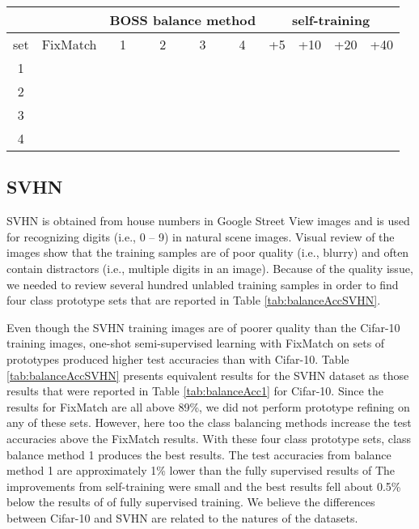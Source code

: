 \documentclass[final]{cvpr}
\newcommand{\OSSSL}{one-shot semi-supervised learning }
\begin{document}
\begin{table*}
	\begin{center}
		\begin{tabular}{|c|c|c|c|c|c|c|c|c|c|}
			\hline
			&  & \multicolumn{4}{|c|}{BOSS balance method} & \multicolumn{4}{|c|}{self-training}    \\
			\hline
			set  & FixMatch & 1 & 2 & 3 & 4 & +5 & +10 & +20 & +40    \\
			\hline\hline
			1 &   &    &   &  &  &  &  &  &    \\
			\hline
			2 &   &    &   &  &  &  &  &  &    \\
			\hline
			3 &   &    &   &  &  &  &  &  &    \\
			\hline
			4 &   &    &   &  &  &  &  &  &    \\
			\hline
			
		\end{tabular}
	\end{center}
	\caption{\textbf{SVHN.} BOSS methods are compared using four sets of class prototypes (i.e., 1 prototype per class) for SVHN.  The FixMatch column shows results for the original FixMatch code on the prototype sets. The next four columns gives the accuracy results for the class balance methods  Results are an average of test accuracies for four runs.  The self-training iteration was performed on the results from the class balancing shown in bold.
	}
	\label{tab:balanceAccSVHN}
\end{table*}

\subsection{SVHN}
\label{sec:svhn}

SVHN is obtained from house numbers in Google Street View images and is used for recognizing digits (i.e., 0 -- 9) in natural scene images. 
Visual review of the images show that the training samples are of poor quality (i.e., blurry) and often contain distractors (i.e.,  multiple digits in an image).
Because of the quality issue, we needed to review several hundred unlabled training samples in order to find four class prototype sets that are reported in Table \ref{tab:balanceAccSVHN}.

Even though the SVHN training images are of poorer quality than the Cifar-10 training images, \OSSSL with FixMatch on sets of prototypes produced higher test accuracies than with Cifar-10.
Table \ref{tab:balanceAccSVHN} presents equivalent results for the SVHN dataset as those results that were reported in Table \ref{tab:balanceAcc1} for Cifar-10.
Since the results for FixMatch are all above 89\%, we did not perform prototype refining on any of these sets.
However, here too the class balancing methods increase the test accuracies above the FixMatch results.
With these four class prototype sets, class balance method 1 produces the best results.
The test accuracies from balance method 1 are approximately 1\% lower than the fully supervised results of 
The improvements from self-training were small and the best results fell about 0.5\% below the results of of fully supervised training.
We believe the differences between Cifar-10 and SVHN are related to the natures of the datasets.
\end{document}
